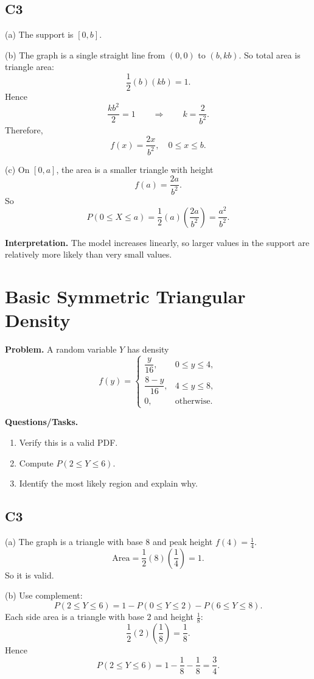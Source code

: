\subsection*{C3}
(a) The support is $[0,b]$.

(b) The graph is a single straight line from $(0,0)$ to $(b,kb)$.
So total area is triangle area:
\[
\frac12(b)(kb)=1.
\]
Hence
\[
\frac{kb^2}{2}=1
\qquad \Rightarrow \qquad
k=\frac{2}{b^2}.
\]
Therefore,
\[
f(x)=\frac{2x}{b^2},\quad 0\le x\le b.
\]

(c) On $[0,a]$, the area is a smaller triangle with height
\[
f(a)=\frac{2a}{b^2}.
\]
So
\[
P(0\le X\le a)=\frac12(a)\left(\frac{2a}{b^2}\right)=\frac{a^2}{b^2}.
\]

\textbf{Interpretation.}
The model increases linearly, so larger values in the support are relatively more likely than very small values.

\section{Basic Symmetric Triangular Density}

\textbf{Problem.}
A random variable $Y$ has density
\[
f(y)=\begin{cases}
\dfrac{y}{16}, & 0\le y\le 4,\\
\dfrac{8-y}{16}, & 4\le y\le 8,\\
0, & \text{otherwise.}
\end{cases}
\]

\textbf{Questions/Tasks.}
\begin{enumerate}[label=(\alph*)]
\item Verify this is a valid PDF.
\item Compute $P(2\le Y\le 6)$.
\item Identify the most likely region and explain why.
\end{enumerate}

\subsection*{C3}
(a) The graph is a triangle with base $8$ and peak height $f(4)=\frac14$.
\[
\text{Area}=\frac12(8)\left(\frac14\right)=1.
\]
So it is valid.

(b) Use complement:
\[
P(2\le Y\le 6)=1-P(0\le Y\le 2)-P(6\le Y\le 8).
\]
Each side area is a triangle with base $2$ and height $\frac18$:
\[
\frac12(2)\left(\frac18\right)=\frac18.
\]
Hence
\[
P(2\le Y\le 6)=1-\frac18-\frac18=\frac34.
\]

